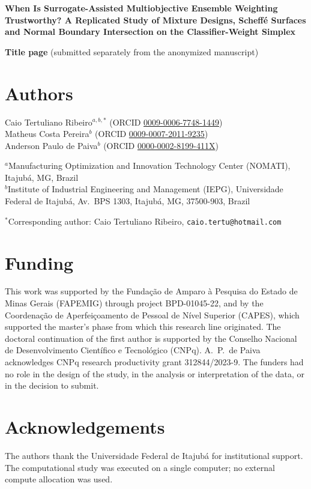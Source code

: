 \documentclass[11pt,a4paper]{article}
\begin{document}
{\Large\bfseries When Is Surrogate-Assisted Multiobjective Ensemble Weighting Trustworthy? A Replicated Study of
Mixture Designs, Scheff\'e Surfaces and Normal Boundary Intersection on the Classifier-Weight Simplex\par}

\medskip
\textbf{Title page} (submitted separately from the anonymized manuscript)

\section*{Authors}
Caio Tertuliano Ribeiro$^{a,b,*}$ (ORCID \href{https://orcid.org/0009-0006-7748-1449}{0009-0006-7748-1449})\\
Matheus Costa Pereira$^{b}$ (ORCID \href{https://orcid.org/0009-0007-2011-9235}{0009-0007-2011-9235})\\
Anderson Paulo de Paiva$^{b}$ (ORCID \href{https://orcid.org/0000-0002-8199-411X}{0000-0002-8199-411X})

$^{a}$Manufacturing Optimization and Innovation Technology Center (NOMATI), Itajub\'a, MG, Brazil\\
$^{b}$Institute of Industrial Engineering and Management (IEPG), Universidade Federal de Itajub\'a, Av.\ BPS 1303,
Itajub\'a, MG, 37500-903, Brazil

$^{*}$Corresponding author: Caio Tertuliano Ribeiro, \texttt{caio.tertu@hotmail.com}

\section*{Funding}
This work was supported by the Funda\c{c}\~ao de Amparo \`a Pesquisa do Estado de Minas Gerais (FAPEMIG) through
project BPD-01045-22, and by the Coordena\c{c}\~ao de Aperfei\c{c}oamento de Pessoal de N\'ivel Superior (CAPES),
which supported the master's phase from which this research line originated. The doctoral continuation of the first
author is supported by the Conselho Nacional de Desenvolvimento Cient\'ifico e Tecnol\'ogico (CNPq).
A.~P.\ de Paiva acknowledges CNPq research productivity grant 312844/2023-9. The funders had no role in the design of
the study, in the analysis or interpretation of the data, or in the decision to submit.

\section*{Acknowledgements}
The authors thank the Universidade Federal de Itajub\'a for institutional support. The computational study was
executed on a single computer; no external compute allocation was used.
\end{document}
